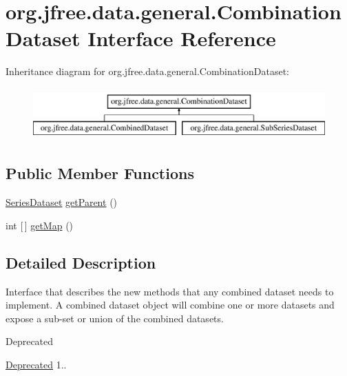 \hypertarget{interfaceorg_1_1jfree_1_1data_1_1general_1_1_combination_dataset}{}\section{org.\+jfree.\+data.\+general.\+Combination\+Dataset Interface Reference}
\label{interfaceorg_1_1jfree_1_1data_1_1general_1_1_combination_dataset}
Inheritance diagram for org.\+jfree.\+data.\+general.\+Combination\+Dataset\+:\begin{figure}[H]
\begin{center}
\leavevmode
\includegraphics[height=2.000000cm]{interfaceorg_1_1jfree_1_1data_1_1general_1_1_combination_dataset}
\end{center}
\end{figure}
\subsection*{Public Member Functions}
\begin{DoxyCompactItemize}
\item 
\mbox{\hyperlink{interfaceorg_1_1jfree_1_1data_1_1general_1_1_series_dataset}{Series\+Dataset}} \mbox{\hyperlink{interfaceorg_1_1jfree_1_1data_1_1general_1_1_combination_dataset_aba6918d290f095187907982432506bfe}{get\+Parent}} ()
\item 
int \mbox{[}$\,$\mbox{]} \mbox{\hyperlink{interfaceorg_1_1jfree_1_1data_1_1general_1_1_combination_dataset_a66aff831b2ae72a85d4485c56f8b0d21}{get\+Map}} ()
\end{DoxyCompactItemize}


\subsection{Detailed Description}
Interface that describes the new methods that any combined dataset needs to implement. A combined dataset object will combine one or more datasets and expose a sub-\/set or union of the combined datasets.

\begin{DoxyRefDesc}{Deprecated}
\item[\mbox{\hyperlink{deprecated__deprecated000258}{Deprecated}}]1.. \end{DoxyRefDesc}


